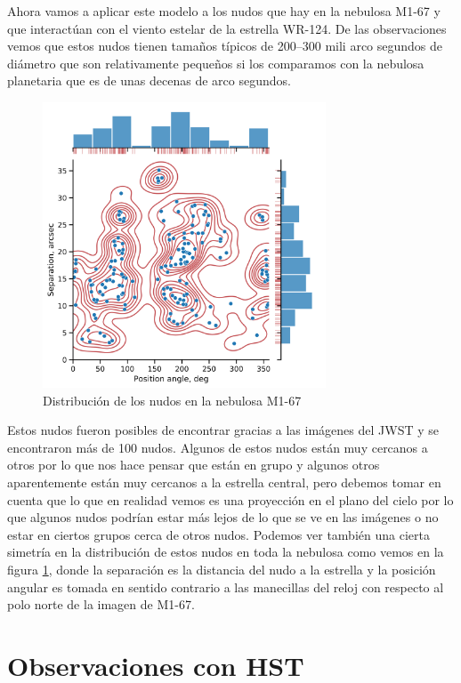 \documentclass{book}
\begin{document}
Ahora vamos a aplicar este modelo a los nudos que hay en la nebulosa M1-67 y que interactúan con el viento estelar de la estrella WR-124. De las observaciones vemos que estos nudos tienen tamaños típicos de 200--300 mili arco segundos de diámetro que son relativamente pequeños si los comparamos con la nebulosa planetaria que es de unas decenas de arco segundos. 

\begin{figure}[h!]
    \centering    \includegraphics[width=0.75\textwidth]{images Chapter 2/C2_nudos_distribucion.png}
    \caption{Distribución de los nudos en la nebulosa M1-67}
    \label{fig:dis_nudos}
\end{figure}

Estos nudos fueron posibles de encontrar gracias a las imágenes del JWST y se encontraron más de 100 nudos. Algunos de estos nudos están muy cercanos a otros por lo que nos hace pensar que están en grupo y algunos otros aparentemente están muy cercanos a la estrella central, pero debemos tomar en cuenta que lo que en realidad vemos es una proyección en el plano del cielo por lo que algunos nudos podrían estar más lejos de lo que se ve en las imágenes o no estar en ciertos grupos cerca de otros nudos. Podemos ver también una cierta simetría en la distribución de estos nudos en toda la nebulosa como vemos en la figura \ref{fig:dis_nudos}, donde la separación es la distancia del nudo a la estrella y la posición angular es tomada en sentido contrario a las manecillas del reloj con respecto al polo norte de la imagen de M1-67.

\section{Observaciones con HST}
\end{document}
